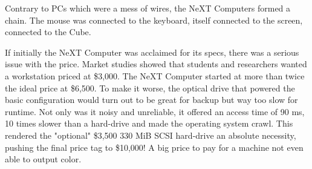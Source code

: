 \begin{figure}
\centering
{}
\end{figure}


Contrary to PCs which were a mess of wires, the NeXT Computers formed a chain. The mouse was connected to the keyboard, itself connected to the screen, connected to the Cube.\\


\par


If initially the NeXT Computer was acclaimed for its specs, there was a serious issue with the price. Market studies showed that students and researchers wanted a workstation priced at \$3,000. The NeXT Computer started at more than twice the ideal price at \$6,500. To make it worse, the optical drive that powered the basic configuration would turn out to be great for backup but way too slow for runtime. Not only was it noisy and unreliable, it offered an access time of 90 ms, 10 times slower than a hard-drive and made the operating system crawl. This rendered the "optional" \$3,500 330 MiB SCSI hard-drive an absolute necessity, pushing the final price tag to \$10,000! A big price to pay for a machine not even able to output color.\\
\par




